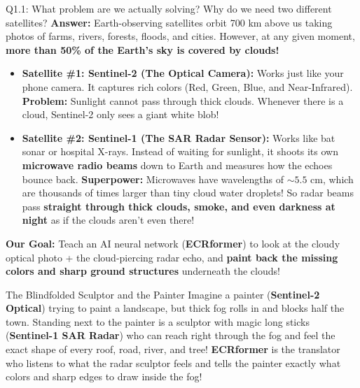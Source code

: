 \documentclass[11pt,a4paper]{article}
\begin{document}
\begin{qbox}{Q1.1: What problem are we actually solving? Why do we need two different satellites?}
\textbf{Answer:}
Earth-observing satellites orbit 700 km above us taking photos of farms, rivers, forests, floods, and cities. However, at any given moment, \textbf{more than 50\% of the Earth's sky is covered by clouds!}
\begin{itemize}[leftmargin=18pt]
    \item \textbf{Satellite \#1: Sentinel-2 (The Optical Camera):} Works just like your phone camera. It captures rich colors (Red, Green, Blue, and Near-Infrared). \textbf{Problem:} Sunlight cannot pass through thick clouds. Whenever there is a cloud, Sentinel-2 only sees a giant white blob!
    \item \textbf{Satellite \#2: Sentinel-1 (The SAR Radar Sensor):} Works like bat sonar or hospital X-rays. Instead of waiting for sunlight, it shoots its own \textbf{microwave radio beams} down to Earth and measures how the echoes bounce back. \textbf{Superpower:} Microwaves have wavelengths of $\sim 5.5\text{ cm}$, which are thousands of times larger than tiny cloud water droplets! So radar beams pass \textbf{straight through thick clouds, smoke, and even darkness at night} as if the clouds aren't even there!
\end{itemize}

\textbf{Our Goal:} Teach an AI neural network (\textbf{ECRformer}) to look at the cloudy optical photo + the cloud-piercing radar echo, and \textbf{paint back the missing colors and sharp ground structures} underneath the clouds!
\end{qbox}

\begin{analogybox}{The Blindfolded Sculptor and the Painter}
Imagine a painter (\textbf{Sentinel-2 Optical}) trying to paint a landscape, but thick fog rolls in and blocks half the town. Standing next to the painter is a sculptor with magic long sticks (\textbf{Sentinel-1 SAR Radar}) who can reach right through the fog and feel the exact shape of every roof, road, river, and tree!
\textbf{ECRformer} is the translator who listens to what the radar sculptor feels and tells the painter exactly what colors and sharp edges to draw inside the fog!
\end{analogybox}
\end{document}
